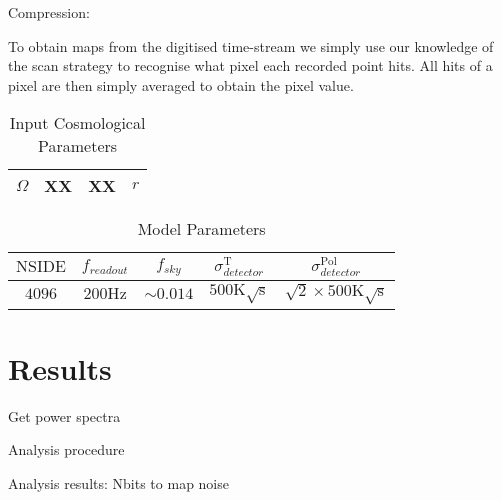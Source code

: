 \documentclass[apj]{emulateapj}
\begin{document}
Compression:

To obtain maps from the digitised time-stream we simply use our knowledge of the scan strategy to recognise what pixel each recorded point hits. All hits of a pixel are then simply averaged to obtain the pixel value.



\begin{table}[tbh]
\begin{center}
\caption{\label{tab:inputcosparams} Input Cosmological Parameters}
\small
\begin{tabular}{l | c c c }
$\Omega$ & XX&XX&$r$\\
\hline

\end{tabular}
 \normalsize
\end{center}
\end{table}

\begin{table}[tbh]
\begin{center}
\caption{\label{tab:modelparams} Model Parameters}
\small
\begin{tabular}{c c c c c}
$\mathrm{NSIDE}$ & $f_{readout}$ & $f_{sky}$ & $\sigma^{\mathrm{T}}_{detector}$ & $\sigma^{\mathrm{Pol}}_{detector}$\\
\hline
$4096$ & $200\mathrm{Hz}$ & $\sim 0.014$ & $500\mathrm{K}\sqrt{\mathrm{s}}$ & $\sqrt{2}\times500\mathrm{K}\sqrt{\mathrm{s}}$\\

\end{tabular}
 \normalsize
\end{center}
\end{table}






\section{Results}
\label{sec:results}

Get power spectra

Analysis procedure

Analysis results: Nbits to map noise
\end{document}
